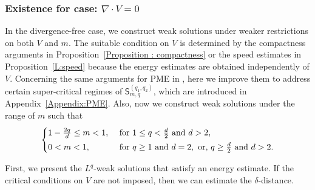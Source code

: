 \documentclass{amsart}
\numberwithin{equation}{section}
\begin{document}
\subsubsection{Existence for case: $\nabla \cdot V =0$}

In the divergence-free case, we construct weak solutions under weaker restrictions on both $V$ and $m$. The suitable condition on $V$ is determined by the compactness arguments in Proposition~\ref{Proposition : compactness} or the speed estimates in Proposition~\ref{L:speed} because the energy estimates are obtained independently of $V$. Concerning the same arguments for PME in \cite{HKK02}, here we improve them to address certain super-critical regimes of $\mathsf{S}_{m,q}^{(q_1,q_2)}$, which are introduced in Appendix~\ref{Appendix:PME}.
Also, now we construct weak solutions under the range of $m$ such that 
\begin{equation*}\label{m:divfree}
	\begin{cases}
		1-\frac{2q}{d} \leq m < 1, & \text{ for } 1\leq q < \frac{d}{2} \text{ and } d>2,  \vspace{1 mm}\\
		0<m<1, & \text{ for } q\geq 1 \text{ and } d=2, \text{ or, } q\geq \frac{d}{2} \text{ and } d>2. 
	\end{cases}
\end{equation*}


First, we present the \( L^q \)-weak solutions that satisfy an energy estimate. If the critical conditions on \( V \) are not imposed, then we can estimate the \( \delta \)-distance.
\end{document}
